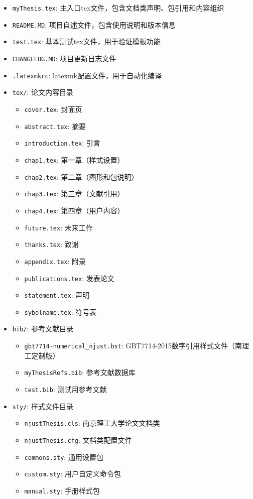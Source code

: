 \begin{itemize}

\item \texttt{myThesis.tex}: 主入口tex文件，包含文档类声明、包引用和内容组织
\item \texttt{README.MD}: 项目自述文件，包含使用说明和版本信息
\item \texttt{test.tex}: 基本测试tex文件，用于验证模板功能
\item \texttt{CHANGELOG.MD}: 项目更新日志文件
\item \texttt{.latexmkrc}: latexmk配置文件，用于自动化编译

\item \texttt{tex/}: 论文内容目录
    \begin{itemize}
        \item \texttt{cover.tex}: 封面页
        \item \texttt{abstract.tex}: 摘要
        \item \texttt{introduction.tex}: 引言
        \item \texttt{chap1.tex}: 第一章（样式设置）
        \item \texttt{chap2.tex}: 第二章（图形和包说明）
        \item \texttt{chap3.tex}: 第三章（文献引用）
        \item \texttt{chap4.tex}: 第四章（用户内容）
        \item \texttt{future.tex}: 未来工作
        \item \texttt{thanks.tex}: 致谢
        \item \texttt{appendix.tex}: 附录
        \item \texttt{publications.tex}: 发表论文
        \item \texttt{statement.tex}: 声明
        \item \texttt{sybolname.tex}: 符号表
    \end{itemize}

\item \texttt{bib/}: 参考文献目录
    \begin{itemize}
        \item \texttt{gbt7714-numerical\_njust.bst}: GBT7714-2015数字引用样式文件（南理工定制版）
        \item \texttt{myThesisRefs.bib}: 参考文献数据库
        \item \texttt{test.bib}: 测试用参考文献
    \end{itemize}

\item \texttt{sty/}: 样式文件目录
    \begin{itemize}
        \item \texttt{njustThesis.cls}: 南京理工大学论文文档类
        \item \texttt{njustThesis.cfg}: 文档类配置文件
        \item \texttt{commons.sty}: 通用设置包
        \item \texttt{custom.sty}: 用户自定义命令包
        \item \texttt{manual.sty}: 手册样式包
    \end{itemize}


\end{itemize}
